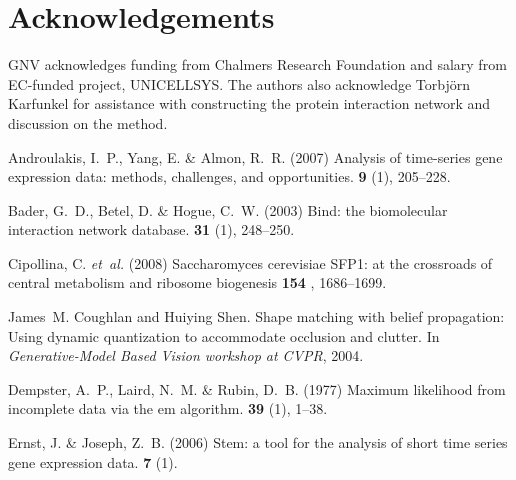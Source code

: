 \documentclass{bioinfo}
\begin{document}
\section{Acknowledgements}
GNV acknowledges funding from Chalmers Research Foundation and
  salary  from EC-funded project, UNICELLSYS. The authors also acknowledge Torbj\"orn Karfunkel for assistance with constructing the protein interaction network and discussion on the method.

%
%
\begin{thebibliography}{}

Androulakis, I.~P., Yang, E.  \& Almon, R.~R. (2007{\em{}}) Analysis of
  time-series gene expression data: methods, challenges, and opportunities.
 {\bf 9} (1),
  205--228.

Bader, G.~D., Betel, D.  \& Hogue, C.~W. (2003{\em{}}) Bind: the biomolecular
  interaction network database.
 {\bf 31} (1), 248--250.


Cipollina, C. {\em et~al.}  (2008{\em{}}) Saccharomyces cerevisiae SFP1: at the crossroads of central metabolism and ribosome biogenesis
 {\bf 154} , 1686--1699.

James~M. Coughlan and Huiying Shen.
\newblock Shape matching with belief propagation: Using dynamic quantization to
  accommodate occlusion and clutter.
\newblock In {\em Generative-Model Based Vision workshop at CVPR}, 2004.

Dempster, A.~P., Laird, N.~M.  \& Rubin, D.~B. (1977{\em{}}) Maximum likelihood
  from incomplete data via the em algorithm.
 {\bf 39} (1), 1--38.

Ernst, J. \& Joseph, Z.~B. (2006{\em{}}) Stem: a tool for the analysis of short
  time series gene expression data.
 {\bf 7} (1).


\end{thebibliography}
\end{document}
